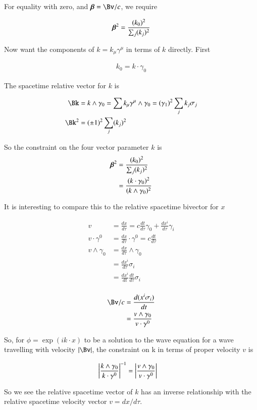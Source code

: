 \documentclass{article}
\begin{document}
For equality with zero, and $\Bbeta = \Bv/c$, we require 

\begin{align*}
\boldsymbol{\beta}^2 = \frac{(k_0)^2}{\sum_j (k_j)^2}
\end{align*}

Now want the components of $k = k_\mu \gamma^\mu$ in terms of $k$ directly.  First

\begin{align*}
k_0 = k \cdot \gamma_0
\end{align*}

The spacetime relative vector for $k$ is

\begin{align*}
\Bk &= k \wedge \gamma_0 = \sum k_\mu \gamma^\mu \wedge \gamma_0 = (\gamma_1)^2 \sum_j k_j \sigma_j \\
\Bk^2 &= (\pm 1)^2 \sum_j (k_j)^2 
\end{align*}

So the constraint on the four vector parameter $k$ is 
\begin{align*}
\boldsymbol{\beta}^2
&= \frac{(k_0)^2}{\sum_j (k_j)^2} \\
&= \frac{(k \cdot \gamma_0)^2}{(k \wedge \gamma_0)^2} \\
\end{align*}

It is interesting to compare this to the relative spacetime bivector for $x$

\begin{align*}
v &= \frac{dx}{d\tau} = c \frac{dt}{d\tau} \gamma_0 + \frac{dx^i}{d\tau} \gamma_i \\
v \cdot \gamma^0 &= \frac{dx}{d\tau} \cdot \gamma^0 = c \frac{dt}{d\tau} \\
v \wedge \gamma_0 &= \frac{dx}{d\tau} \wedge \gamma_0 \\
&= \frac{dx^i}{d\tau} \sigma_i \\
&= \frac{dx^i}{dt} \frac{dt}{d\tau} \sigma_i \\
\end{align*}

\begin{align*}
\Bv/c
&= \frac{d (x^i \sigma_i) }{dt} \\
&= \frac{v \wedge \gamma_0}{ v \cdot \gamma^0 }
\end{align*}

So, for $\phi = \exp(i k \cdot x)$ to be a solution to the wave equation for a wave travelling with velocity $\Abs{\Bv}$, the constraint on k
in terms of proper velocity $v$ is

\begin{align}
\left\lvert{\frac{k \wedge \gamma_0}{ k \cdot \gamma^0 }}\right\rvert^{-1} &=
\left\lvert{\frac{v \wedge \gamma_0}{ v \cdot \gamma^0 }}\right\rvert
\end{align}

So we see the relative spacetime vector of $k$ has an inverse relationship with the relative spacetime velocity vector $v = dx/d\tau$.

%
%
\end{document}
